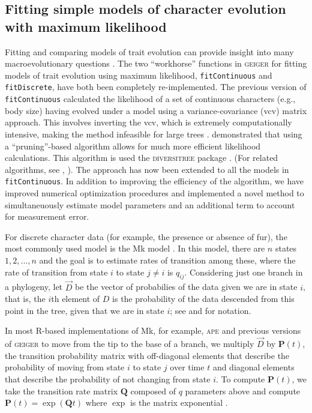 \subsection{Fitting simple models of character evolution with maximum likelihood}

Fitting and comparing  models of trait evolution can provide insight into many macroevolutionary questions \citep{PennellHarmon}. The two ``workhorse'' functions in \textsc{geiger} for fitting models of trait evolution using maximum likelihood, \texttt{fitContinuous} and \texttt{fitDiscrete}, have both been completely re-implemented. The previous version of \texttt{fitContinuous} calculated the likelihood of a set of continuous characters (e.g., body size) having evolved under a model using a variance-covariance (vcv) matrix approach. This involves inverting the vcv, which is extremely computationally intensive, making the method infeasible for large trees \citep{Hadfield2010, FitzJohn2012, Freckleton2012, Ho2014}. \citet{FitzJohn2012} demonstrated that using a ``pruning''-based algorithm \citep{Felsenstein1973} allows for much more efficient likelihood calculations. This algorithm is used the \textsc{diversitree} package \citep{FitzJohn2012}. (For related algorithms, see \citealt{Freckleton2012}, \citealt{Ho2014}). The approach has now been extended to all the models in \texttt{fitContinuous}. In addition to improving the efficiency of the algorithm, we have improved numerical optimization procedures and implemented a novel method to simultaneuously estimate model parameters and an additional term to account for measurement error.

For discrete character data (for example, the presence or absence of fur), the most commonly used model is the Mk model \citep{Pagel1994, Lewis2001}.  In this model, there are $n$ states $1, 2, ..., n$ and the goal is to estimate rates of
transition among these, where the rate of transition from state $i$ to
state $j \neq i$ is $q_{ij}$.  Considering just one branch in a
phylogeny, let $\vec D$ be the vector of probabilies of the data given
we are in state $i$, that is, the $i$th element of $D$ is the
probability of the data descended from this point in the tree, given
that we are in state $i$; see \citet{Maddison2007} and \citet{FitzJohn2012}
for notation.

In most R-based implementations of Mk, for example, \textsc{ape} \citep{ape}
and previous versions of \textsc{geiger} \citep{Harmon2008} to move from the
tip to the base of a branch, we multiply $\vec D$ by $\mathbf{P}(t)$, the
transition probability matrix with off-diagonal elements that describe
the probability of moving from state $i$ to state $j$ over time $t$
and diagonal elements that describe the probability of not changing
from state $i$.  To compute $\mathbf{P}(t)$, we take the transition rate matrix
$\mathbf{Q}$ composed of $q$ parameters above and compute
$\mathbf{P}(t) = \exp(\mathbf{Q} t)$ where $\exp$ is the matrix
exponential \citep{Sidje-1998-130}.

